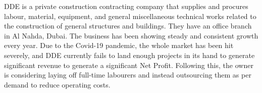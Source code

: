 

{DDE is a private construction contracting company that supplies and procures labour, material, equipment, and general miscellaneous technical works related to the construction of general structures and buildings. They have an office branch in Al Nahda, Dubai. The business has been showing steady and consistent growth every year. Due to the Covid-19 pandemic, the whole market has been hit severely, and DDE currently fails to land enough projects in its hand to generate significant revenue to generate a significant Net Profit. Following this, the owner is considering laying off full-time labourers and instead outsourcing them as per demand to reduce operating costs.}

